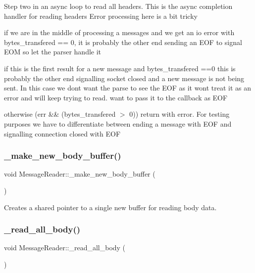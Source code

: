 Step two in an async loop to read all headers. This is the async completion handler for reading headers Error processing here is a bit tricky
\begin{DoxyItemize}
\item if we are in the middle of processing a messages and we get an io error with bytes\+\_\+transfered == 0, it is probably the other end sending an E\+OF to signal E\+OM so let the parser handle it
\item if this is the first result for a new message and bytes\+\_\+transfered ==0 this is probably the other end signalling socket closed and a new message is not being sent. In this case we dont want the parse to see the E\+OF as it wont treat it as an error and will keep trying to read. want to pass it to the callback as E\+OF
\item otherwise (err \&\& (bytes\+\_\+transfered $>$ 0)) return with error. For testing purposes we have to differentiate between ending a message with E\+OF and signalling connection closed with E\+OF
\end{DoxyItemize}\mbox{\label{class_message_reader_a4272b25b74e5b46f37754751da8689c5}} 
\subsubsection{\texorpdfstring{\+\_\+make\+\_\+new\+\_\+body\+\_\+buffer()}{\_make\_new\_body\_buffer()}}
{\footnotesize\ttfamily void Message\+Reader\+::\+\_\+make\+\_\+new\+\_\+body\+\_\+buffer (\begin{DoxyParamCaption}{ }\end{DoxyParamCaption})\hspace{0.3cm}{\ttfamily [protected]}}

Creates a shared pointer to a single new buffer for reading body data. \mbox{\label{class_message_reader_a5d38bae22274c77c8bf7b704aef2bccc}} 
\subsubsection{\texorpdfstring{\+\_\+read\+\_\+all\+\_\+body()}{\_read\_all\_body()}}
{\footnotesize\ttfamily void Message\+Reader\+::\+\_\+read\+\_\+all\+\_\+body (\begin{DoxyParamCaption}{ }\end{DoxyParamCaption})\hspace{0.3cm}{\ttfamily [protected]}}

